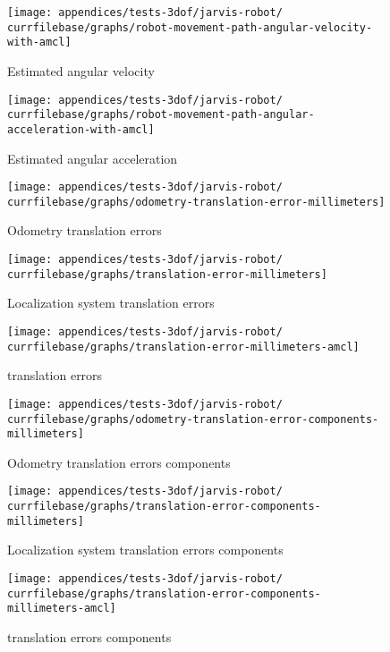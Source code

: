 \begin{figure}[H]
	\centering
	\texttt{[image: appendices/tests-3dof/jarvis-robot/\\currfilebase/graphs/robot-movement-path-angular-velocity-with-amcl]}
	\caption{Estimated angular velocity}
\end{figure}

\begin{figure}[H]
	\centering
	\texttt{[image: appendices/tests-3dof/jarvis-robot/\\currfilebase/graphs/robot-movement-path-angular-acceleration-with-amcl]}
	\caption{Estimated angular acceleration}
\end{figure}


\begin{figure}[H]
	\centering
	\texttt{[image: appendices/tests-3dof/jarvis-robot/\\currfilebase/graphs/odometry-translation-error-millimeters]}
	\caption{Odometry translation errors}
\end{figure}

\begin{figure}[H]
	\centering
	\texttt{[image: appendices/tests-3dof/jarvis-robot/\\currfilebase/graphs/translation-error-millimeters]}
	\caption{Localization system translation errors}
\end{figure}

\begin{figure}[H]
	\centering
	\texttt{[image: appendices/tests-3dof/jarvis-robot/\\currfilebase/graphs/translation-error-millimeters-amcl]}
	\caption{ translation errors}
\end{figure}


\begin{figure}[H]
	\centering
	\texttt{[image: appendices/tests-3dof/jarvis-robot/\\currfilebase/graphs/odometry-translation-error-components-millimeters]}
	\caption{Odometry translation errors components}
\end{figure}

\begin{figure}[H]
	\centering
	\texttt{[image: appendices/tests-3dof/jarvis-robot/\\currfilebase/graphs/translation-error-components-millimeters]}
	\caption{Localization system translation errors components}
\end{figure}

\begin{figure}[H]
	\centering
	\texttt{[image: appendices/tests-3dof/jarvis-robot/\\currfilebase/graphs/translation-error-components-millimeters-amcl]}
	\caption{ translation errors components}
\end{figure}



